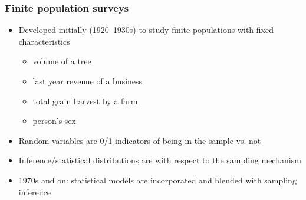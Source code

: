 \documentclass[handout]{beamer}
\begin{document}
\begin{frame}\frametitle{Finite population surveys}

\begin{itemize}
    \item Developed initially (1920--1930s) to study finite populations with fixed characteristics
        \begin{itemize}
            \item volume of a tree
            \item last year revenue of a business
            \item total grain harvest by a farm
            \item person's sex
        \end{itemize}
    \item Random variables are 0/1 indicators of being in the sample vs. not
    \item Inference/statistical distributions are with respect to the sampling mechanism
    \item 1970s and on: statistical models are incorporated and blended with sampling inference
\end{itemize}

\end{frame}
\end{document}
